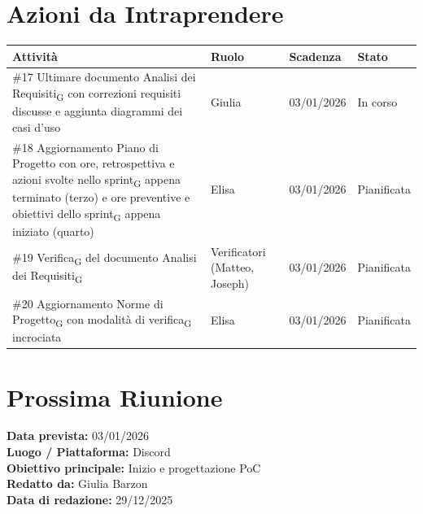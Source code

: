 \documentclass[a4paper,12pt]{article}
\newcommand{\gls}[1]{#1\textsubscript{G}}
\begin{document}
\section*{ Azioni da Intraprendere}

\begin{longtable}{|p{}|p{}|p{}|p{}|}
\hline
\textbf{Attività} & \textbf{Ruolo} & \textbf{Scadenza} & \textbf{Stato} \\ \hline
\#17 Ultimare documento \gls{Analisi dei Requisiti} con correzioni requisiti discusse e aggiunta diagrammi dei casi d'uso & Giulia & 03/01/2026 & In corso \\ \hline
\#18 Aggiornamento Piano di Progetto con ore, retrospettiva e azioni svolte nello \gls{sprint} appena terminato (terzo) e ore preventive e obiettivi dello \gls{sprint} appena iniziato (quarto) & Elisa & 03/01/2026 & Pianificata \\ \hline
\#19 \gls{Verifica} del documento \gls{Analisi dei Requisiti} & Verificatori (Matteo, Joseph) & 03/01/2026 & Pianificata \\ \hline
\#20 Aggiornamento \gls{Norme di Progetto} con modalità di \gls{verifica} incrociata & Elisa & 03/01/2026 & Pianificata \\ \hline

\end{longtable}


\section*{ Prossima Riunione}
\textbf{Data prevista:} 03/01/2026 \\
\textbf{Luogo / Piattaforma:} Discord \\
\textbf{Obiettivo principale:} Inizio e progettazione PoC \\


\textbf{Redatto da:} Giulia Barzon \\
\textbf{Data di redazione:} 29/12/2025
\end{document}
